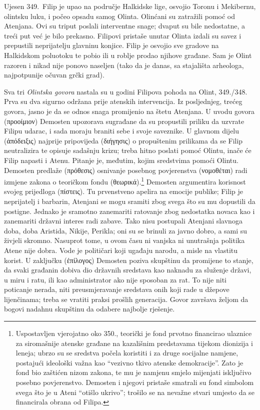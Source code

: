 Ujesen 349.\ Filip je upao na područje Halkidske lige, osvojio Toronu i Mekibernu, olintsku luku, i počeo opsadu samog Olinta. Olinćani su zatražili pomoć od Atenjana. Ovi su triput poslali interventne snage; dvaput su bile nedostatne, a treći put već je bilo prekasno. Filipovi pristaše unutar Olinta izdali su savez i prepustili neprijatelju glavninu konjice. Filip je osvojio sve gradove na Halkidskom poluotoku te pobio ili u roblje prodao njihove građane. Sam je Olint razoren i nikad nije ponovo naseljen (tako da je danas, sa stajališta arheologa, najpotpunije očuvan grčki grad).

Sva tri \textit{Olintska govora} nastala su u godini Filipova pohoda na Olint, 349./348. Prva su dva sigurno održana prije atenskih intervencija. Iz posljednjeg, trećeg govora, jasno je da se odnos snaga promijenio na štetu Atenjana. U uvodu govora \textgreek[variant=ancient]{(προοίμιον)} Demosten upozorava sugrađane da su propustili priliku da uzvrate Filipu udarac, i sada moraju braniti sebe i svoje saveznike. U glavnom dijelu \textgreek[variant=ancient]{(ἀπόδειξις)} najprije pripovijeda  \textgreek[variant=ancient]{(διήγησις)} o propuštenim prilikama da se Filip neutralizira te opisuje sadašnju krizu; treba hitno poslati pomoć Olintu, inače će Filip napasti i Atenu. Pitanje je, međutim, kojim sredstvima pomoći Olintu. Demosten predlaže \textgreek[variant=ancient]{(πρόθεσις)} osnivanje posebnog povjerenstva \textgreek[variant=ancient]{(νομοθέται)} radi izmjene zakona o teoričkom fondu \textgreek[variant=ancient]{(θεωρικά).}\footnote{Uspostavljen vjerojatno oko 350., teorički je fond prvotno financirao ulaznice za siromašnije atenske građane na kazališnim predstavama tijekom dionizija i leneja; ubrzo su se sredstva počela koristiti i za druge socijalne namjene, postajući ideološki važna kao ``vezivno tkivo atenske demokracije''. Zato je fond bio zaštićen nizom zakona, te mu je namjenu smjelo mijenjati isključivo posebno povjerenstvo. Demosten i njegovi pristaše smatrali su fond simbolom svega što je u Ateni ``otišlo ukrivo''; trošilo se na nevažne stvari umjesto da se financirala obrana od Filipa.} Demosten argumentira korisnost svojeg prijedloga (πίστεις). Tu prvenstveno apelira na emocije publike; Filip je neprijatelj i barbarin, Atenjani se mogu sramiti zbog svega što su mu dopustili da postigne. Jednako je sramotno zanemariti ratovanje zbog nedostatka novaca kao i zanemariti državni interes radi zabave. Tako nisu postupali Atenjani slavnoga doba, doba Aristida, Nikije, Perikla; oni su se brinuli za javno dobro, a sami su živjeli skromno. Nasuprot tome, u ovom času ni vanjska ni unutrašnja politika Atene nije dobra. Vode je političari koji ugađaju narodu, a misle na vlastitu korist. U zaključku (ἐπίλογος) Demosten poziva skupštinu da promijene to stanje, da svaki građanin dobiva dio državnih sredstava kao naknadu za služenje državi, u miru i ratu, ili kao administrator ako nije sposoban za rat. To nije niti poticanje nerada, niti preusmjeravanje sredstava onih koji rade u džepove lijenčinama; treba se vratiti praksi prošlih generacija. Govor završava željom da bogovi nadahnu skupštinu da odabere najbolje rješenje.

